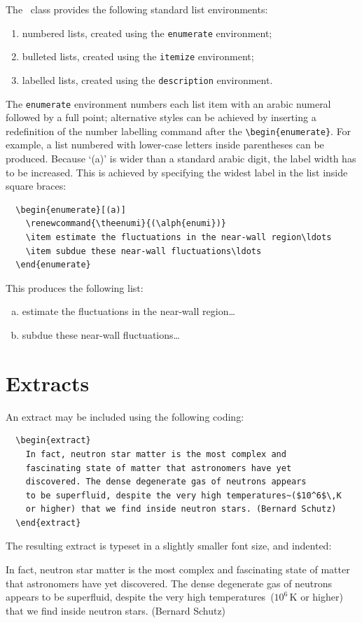 The \cambridge\ class provides the following standard list environments:
\begin{enumerate}
 \item numbered lists, created using the \verb"enumerate" environment;
 \item bulleted lists, created using the \verb"itemize" environment;
 \item labelled lists, created using the \verb"description" environment.
\end{enumerate}
The \verb"enumerate" environment numbers each list item with an arabic numeral followed by a full point; alternative styles can be achieved by inserting a redefinition of the number labelling command after the \verb"\begin{enumerate}". For example, a list numbered with lower-case letters inside parentheses can be produced. Because `(a)' is wider than a standard arabic digit, the label width has to be increased. This is achieved by specifying the widest label in the list inside square braces:
\begin{verbatim}
  \begin{enumerate}[(a)]
    \renewcommand{\theenumi}{(\alph{enumi})}
    \item estimate the fluctuations in the near-wall region\ldots
    \item subdue these near-wall fluctuations\ldots
  \end{enumerate}
\end{verbatim}
This produces the following list:
  \begin{enumerate}[(a)]
    \renewcommand{\theenumi}{(\alph{enumi})}
    \item estimate the fluctuations in the near-wall region\ldots
    \item subdue these near-wall fluctuations\ldots
  \end{enumerate}


\section{Extracts}
\label{extracts}

An extract may be included using the following coding:
\begin{verbatim}
  \begin{extract}
    In fact, neutron star matter is the most complex and
    fascinating state of matter that astronomers have yet
    discovered. The dense degenerate gas of neutrons appears
    to be superfluid, despite the very high temperatures~($10^6$\,K
    or higher) that we find inside neutron stars. (Bernard Schutz)
  \end{extract}
\end{verbatim}
The resulting extract is typeset in a slightly smaller font size, and indented:
  \begin{extract}
    In fact, neutron star matter is the most complex and
    fascinating state of matter that astronomers have yet
    discovered. The dense degenerate gas of neutrons appears
    to be superfluid, despite the very high temperatures~($10^6$\,K
    or higher) that we find inside neutron stars. (Bernard Schutz)
  \end{extract}


